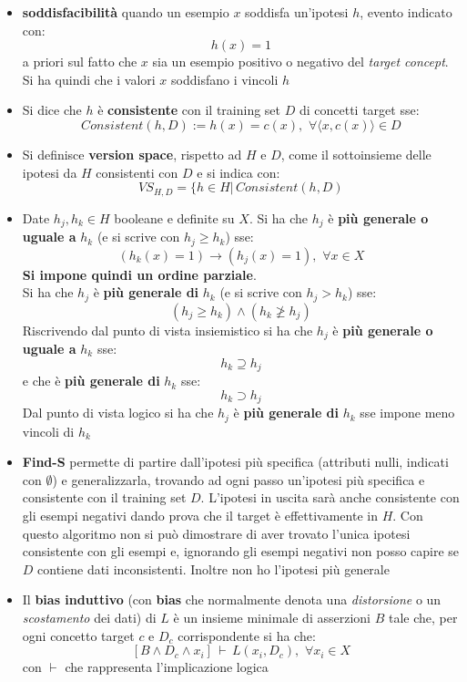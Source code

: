 \documentclass[a4paper,12pt, oneside]{article}
\begin{document}
\begin{itemize}
  \item \textbf{soddisfacibilità} quando un esempio $x$ soddisfa un'ipotesi
  $h$, evento indicato con:
  \[h(x)=1\]
  a priori sul fatto che $x$ sia un esempio positivo o negativo del
  \textit{target concept}. Si ha quindi
  che i valori $x$ soddisfano i vincoli $h$
  \item Si dice che $h$ è \textbf{consistente} con il training set $D$ di
  concetti target sse: 
  \[Consistent(h,D):=h(x)=c(x),\,\,\forall \langle x,c(x)\rangle\in D\]
  \item Si definisce \textbf{version space}, rispetto ad $H$ e $D$, come il
  sottoinsieme delle ipotesi da $H$ consistenti con $D$ e si indica con:
  \[VS_{H,D}=\{h\in H|\,Consistent(h,D)\]
  \item Date $h_j,h_k\in H$ booleane e definite su $X$. Si ha che $h_j$ è
  \textbf{più generale o uguale a} $h_k$ (e si scrive con $h_j\geq h_k$) sse:
  \[(h_k(x)=1)\longrightarrow (h_j(x)=1),\,\,\forall x\in X\]
  \textbf{Si impone quindi un ordine parziale}.\\
  Si ha che $h_j$ è \textbf{più generale di} $h_k$ (e si scrive con $h_j> h_k$)
  sse:
  \[(h_j\geq h_k)\land (h_k\not\geq h_j)\]
  Riscrivendo dal punto di vista insiemistico si ha che $h_j$ è \textbf{più
    generale o uguale a} $h_k$ sse:
  \[h_k\supseteq h_j\]
  e che è \textbf{più generale di} $h_k$ sse:
  \[h_k\supset h_j\]
  Dal punto di vista logico si ha che $h_j$ è \textbf{più generale di} $h_k$
  sse impone meno vincoli di $h_k$
  \item \textbf{Find-S} permette di partire dall'ipotesi più specifica
  (attributi nulli, indicati con $\emptyset$) e generalizzarla, trovando ad
  ogni passo un'ipotesi più specifica e consistente con il training set
  $D$. L'ipotesi in uscita sarà anche consistente con gli esempi negativi
  dando prova che il target è effettivamente in $H$. Con questo algoritmo non
  si può dimostrare di aver trovato l'unica ipotesi consistente con gli esempi
  e, ignorando gli esempi negativi non posso capire se $D$ contiene dati
  inconsistenti. Inoltre non ho l'ipotesi più generale
  \item  Il \textbf{bias induttivo} (con \textbf{bias} che normalmente denota
  una \emph{distorsione} o un \emph{scostamento} dei dati) di $L$ è un insieme
  minimale di asserzioni $B$ tale 
  che, per ogni concetto target $c$ e $D_c$ corrispondente si ha che:
  \[[B\land D_c\land x_i]\,\vdash\,L(x_i,D_c),\,\,\forall x_i\in X\]
  con $\vdash$ che rappresenta l'implicazione logica


\end{itemize}
\end{document}
